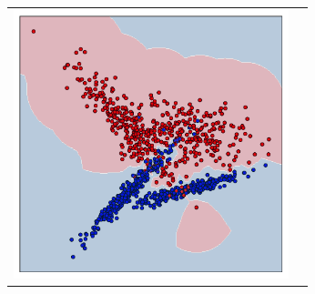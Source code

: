 \documentclass[12pt,fleqn,unicode]{article}
\begin{document}
\begin{figure}[h!]
\begin{tabular}{cc}
	\includegraphics[width=8cm]{../pict/nonsplit_rbf_500.pdf}
\end{tabular}
\end{figure}
\end{document}
